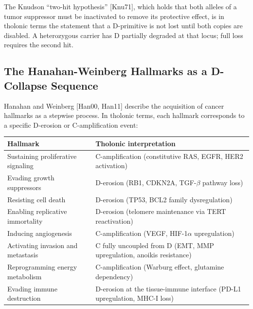 \documentclass[12pt]{article}
\begin{document}
The Knudson ``two-hit hypothesis'' {[}Knu71{]}, which holds that both
alleles of a tumor suppressor must be inactivated to remove its
protective effect, is in tholonic terms the statement that a D-primitive
is not lost until both copies are disabled. A heterozygous carrier has D
partially degraded at that locus; full loss requires the second hit.

\subsection{The Hanahan-Weinberg Hallmarks as a D-Collapse Sequence}\label{the-hanahan-weinberg-hallmarks-as-a-d-collapse-sequence}

Hanahan and Weinberg {[}Han00, Han11{]} describe the acquisition of
cancer hallmarks as a stepwise process. In tholonic terms, each hallmark
corresponds to a specific D-erosion or C-amplification event:

\begin{longtable}[]{@{}
  >{\raggedright\arraybackslash}p{}
  >{\raggedright\arraybackslash}p{}@{}}
\toprule\noalign{}
\begin{minipage}[b]{\linewidth}\raggedright
Hallmark
\end{minipage} & \begin{minipage}[b]{\linewidth}\raggedright
Tholonic interpretation
\end{minipage} \\
\midrule\noalign{}
\endhead
\bottomrule\noalign{}
\endlastfoot
Sustaining proliferative signaling & C-amplification (constitutive RAS,
EGFR, HER2 activation) \\
Evading growth suppressors & D-erosion (RB1, CDKN2A, TGF-\(\beta\)
pathway loss) \\
Resisting cell death & D-erosion (TP53, BCL2 family dysregulation) \\
Enabling replicative immortality & D-erosion (telomere maintenance via
TERT reactivation) \\
Inducing angiogenesis & C-amplification (VEGF, HIF-1\(\alpha\)
upregulation) \\
Activating invasion and metastasis & C fully uncoupled from D (EMT, MMP
upregulation, anoikis resistance) \\
Reprogramming energy metabolism & C-amplification (Warburg effect,
glutamine dependency) \\
Evading immune destruction & D-erosion at the tissue-immune interface
(PD-L1 upregulation, MHC-I loss) \\
\end{longtable}
\end{document}
